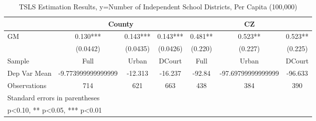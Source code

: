 \begin{table}[htbp]\centering
\def\sym#1{\ifmmode^{#1}\else\(^{#1}\)\fi}
\caption{TSLS Estimation Results, y=Number of Independent School Districts, Per Capita (100,000)}
\begin{tabular}{l*{6}{c}}
\toprule
                &\multicolumn{3}{c}{County}            &\multicolumn{3}{c}{CZ}                \\\cmidrule(lr){2-4}\cmidrule(lr){5-7}
\midrule
GM              &    0.130***&    0.143***&    0.143***&    0.481** &    0.523** &    0.523** \\
                & (0.0442)   & (0.0435)   & (0.0426)   &  (0.220)   &  (0.227)   &  (0.225)   \\
\midrule
Sample          &     Full   &    Urban   &   DCourt   &     Full   &    Urban   &   DCourt   \\
Dep Var Mean    &-9.773999999999999   &  -12.313   &  -16.237   &   -92.84   &-97.69799999999999   &  -96.633   \\
Observations    &      714   &      621   &      663   &      438   &      384   &      390   \\
\bottomrule
\multicolumn{7}{l}{\footnotesize Standard errors in parentheses}\\
\multicolumn{7}{l}{\footnotesize * p<0.10, ** p<0.05, *** p<0.01}\\
\end{tabular}
\end{table}
